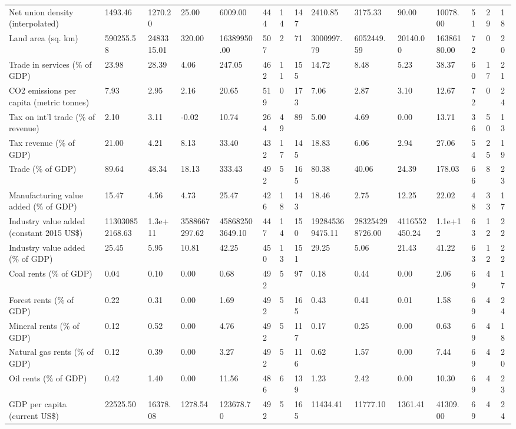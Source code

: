 \begin{longtable}{lllllllllllllll}
Net union density (interpolated) & 1493.46 & 1270.20 & 25.00 & 6009.00 & 444 & 14 & 147 & 2410.85 & 3175.33 & 90.00 & 10078.00 & 51 & 29 & 18\\
Land area (sq. km) & 590255.58 & 2483315.01 & 320.00 & 16389950.00 & 507 & 2 & 71 & 3000997.79 & 6052449.59 & 20140.00 & 16386180.00 & 72 & 0 & 20\\
\addlinespace
Trade in services (\% of GDP) & 23.98 & 28.39 & 4.06 & 247.05 & 462 & 11 & 155 & 14.72 & 8.48 & 5.23 & 38.37 & 60 & 17 & 21\\
CO2 emissions per capita (metric tonnes) & 7.93 & 2.95 & 2.16 & 20.65 & 519 & 0 & 173 & 7.06 & 2.87 & 3.10 & 12.67 & 72 & 0 & 24\\
Tax on int'l trade (\% of revenue) & 2.10 & 3.11 & -0.02 & 10.74 & 264 & 49 & 89 & 5.00 & 4.69 & 0.00 & 13.71 & 36 & 50 & 13\\
Tax revenue (\% of GDP) & 21.00 & 4.21 & 8.13 & 33.40 & 432 & 17 & 145 & 18.83 & 6.06 & 2.94 & 27.06 & 54 & 25 & 19\\
Trade (\% of GDP) & 89.64 & 48.34 & 18.13 & 333.43 & 492 & 5 & 165 & 80.38 & 40.06 & 24.39 & 178.03 & 66 & 8 & 23\\
\addlinespace
Manufacturing value added (\% of GDP) & 15.47 & 4.56 & 4.73 & 25.47 & 426 & 18 & 143 & 18.46 & 2.75 & 12.25 & 22.02 & 48 & 33 & 17\\
Industry value added (constant 2015 US\$) & 113030852168.63 & 1.3e+11 & 3588667297.62 & 458682503649.10 & 447 & 14 & 150 & 192845369475.11 & 283254298726.00 & 4116552450.24 & 1.1e+12 & 63 & 12 & 22\\
Industry value added (\% of GDP) & 25.45 & 5.95 & 10.81 & 42.25 & 450 & 13 & 151 & 29.25 & 5.06 & 21.43 & 41.22 & 63 & 12 & 22\\
Coal rents (\% of GDP) & 0.04 & 0.10 & 0.00 & 0.68 & 492 & 5 & 97 & 0.18 & 0.44 & 0.00 & 2.06 & 69 & 4 & 17\\
Forest rents (\% of GDP) & 0.22 & 0.31 & 0.00 & 1.69 & 492 & 5 & 165 & 0.43 & 0.41 & 0.01 & 1.58 & 69 & 4 & 24\\
\addlinespace
Mineral rents (\% of GDP) & 0.12 & 0.52 & 0.00 & 4.76 & 492 & 5 & 117 & 0.17 & 0.25 & 0.00 & 0.63 & 69 & 4 & 18\\
Natural gas rents (\% of GDP) & 0.12 & 0.39 & 0.00 & 3.27 & 492 & 5 & 116 & 0.62 & 1.57 & 0.00 & 7.44 & 69 & 4 & 20\\
Oil rents (\% of GDP) & 0.42 & 1.40 & 0.00 & 11.56 & 486 & 6 & 139 & 1.23 & 2.42 & 0.00 & 10.30 & 69 & 4 & 23\\
GDP per capita (current US\$) & 22525.50 & 16378.08 & 1278.54 & 123678.70 & 492 & 5 & 165 & 11434.41 & 11777.10 & 1361.41 & 41309.00 & 69 & 4 & 24\\

\end{longtable}

